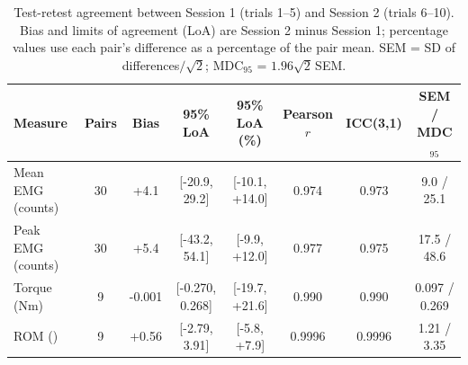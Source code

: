 \begin{table}[H]
\centering
\caption{Test-retest agreement between Session 1 (trials 1--5) and Session 2 (trials 6--10). Bias and limits of agreement (LoA) are Session 2 minus Session 1; percentage values use each pair's difference as a percentage of the pair mean. SEM = SD of differences$/\sqrt{2}$; MDC$_{95}$ = $1.96\sqrt{2}\,$SEM.}
\label{tab:test-retest}
\footnotesize
\setlength{\tabcolsep}{4pt}
\begin{tabular}{l c c c c c c c}
\hline
Measure & Pairs & Bias & 95\% LoA & 95\% LoA (\%) & Pearson $r$ & ICC(3,1) & SEM / MDC$_{95}$ \\
\hline
Mean EMG (counts) & 30 & +4.1 & [-20.9, 29.2] & [-10.1, +14.0] & 0.974 & 0.973 & 9.0 / 25.1 \\
Peak EMG (counts) & 30 & +5.4 & [-43.2, 54.1] & [-9.9, +12.0] & 0.977 & 0.975 & 17.5 / 48.6 \\
Torque (Nm) & 9 & -0.001 & [-0.270, 0.268] & [-19.7, +21.6] & 0.990 & 0.990 & 0.097 / 0.269 \\
ROM (\textdegree{}) & 9 & +0.56 & [-2.79, 3.91] & [-5.8, +7.9] & 0.9996 & 0.9996 & 1.21 / 3.35 \\
\hline
\end{tabular}
\end{table}
